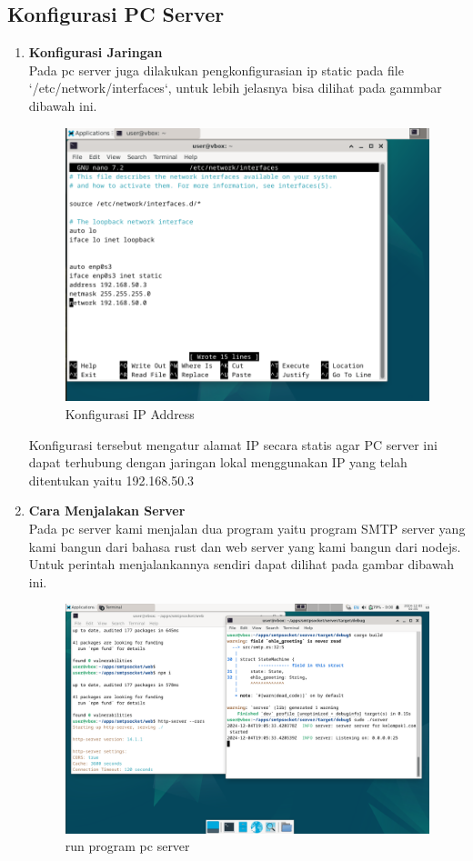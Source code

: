 \documentclass[12pt, a4paper]{article}
\begin{document}
\subsection{Konfigurasi PC Server}
\begin{enumerate}
  \item \textbf{Konfigurasi Jaringan} \\
  Pada pc server juga dilakukan pengkonfigurasian ip static pada file `/etc/network/interfaces`, untuk lebih jelasnya bisa dilihat pada gammbar dibawah ini.
  \begin{figure}[h]
    \centering
    \includegraphics[width=12cm]{server.png}
    \caption{Konfigurasi IP Address}
  \end{figure}
  Konfigurasi tersebut mengatur alamat IP secara statis agar PC server ini dapat terhubung dengan jaringan lokal menggunakan IP yang telah ditentukan yaitu 192.168.50.3
  \item \textbf{Cara Menjalakan Server} \\
    Pada pc server kami menjalan dua program yaitu program SMTP server yang kami bangun dari bahasa rust dan web server yang kami bangun dari nodejs. Untuk perintah menjalankannya sendiri dapat dilihat pada gambar dibawah ini.
    \begin{figure}[h]
    \centering
    \includegraphics[width=12cm]{runserver.png}
    \caption{run program pc server }
  \end{figure}
\pagebreak


\end{enumerate}
\end{document}
